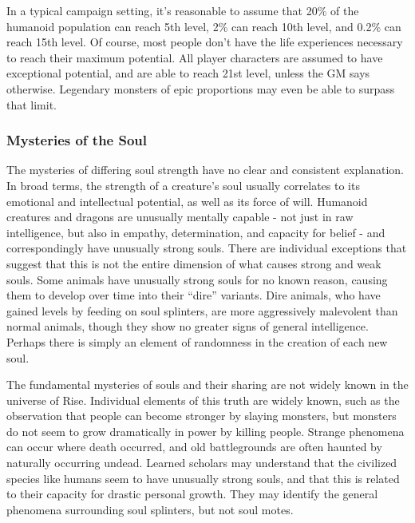       In a typical campaign setting, it's reasonable to assume that 20\% of the humanoid population can reach 5th level, 2\% can reach 10th level, and 0.2\% can reach 15th level.
      Of course, most people don't have the life experiences necessary to reach their maximum potential.
      All player characters are assumed to have exceptional potential, and are able to reach 21st level, unless the GM says otherwise.
      Legendary monsters of epic proportions may even be able to surpass that limit.

    \subsubsection{Mysteries of the Soul}
      The mysteries of differing soul strength have no clear and consistent explanation.
      In broad terms, the strength of a creature's soul usually correlates to its emotional and intellectual potential, as well as its force of will.
      Humanoid creatures and dragons are unusually mentally capable - not just in raw intelligence, but also in empathy, determination, and capacity for belief - and correspondingly have unusually strong souls.
      There are individual exceptions that suggest that this is not the entire dimension of what causes strong and weak souls.
      Some animals have unusually strong souls for no known reason, causing them to develop over time into their ``dire'' variants.
      Dire animals, who have gained levels by feeding on soul splinters, are more aggressively malevolent than normal animals, though they show no greater signs of general intelligence.
      Perhaps there is simply an element of randomness in the creation of each new soul.

      The fundamental mysteries of souls and their sharing are not widely known in the universe of Rise.
      Individual elements of this truth are widely known, such as the observation that people can become stronger by slaying monsters, but monsters do not seem to grow dramatically in power by killing people.
      Strange phenomena can occur where death occurred, and old battlegrounds are often haunted by naturally occurring undead.
      Learned scholars may understand that the civilized species like humans seem to have unusually strong souls, and that this is related to their capacity for drastic personal growth.
      They may identify the general phenomena surrounding soul splinters, but not soul motes.

